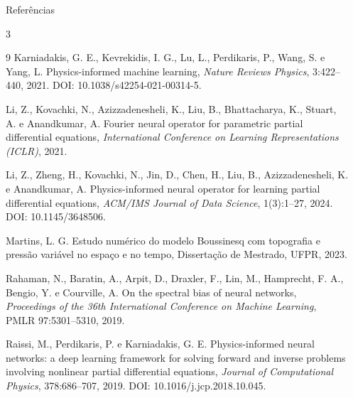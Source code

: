 \documentclass[final]{beamer}
\newlength{\sepwidth}
\newlength{\fullwidth}
\newcommand{\separatorcolumn}{\begin{column}{\sepwidth}\end{column}}
\begin{document}
\begin{frame}[t]
\begin{columns}[t]
\begin{column}{\fullwidth}

  \begin{block}{Referências}
    \scriptsize
    \begin{multicols}{3}
    \begin{thebibliography}{9}
      Karniadakis, G. E., Kevrekidis, I. G., Lu, L., Perdikaris, P., Wang, S. e Yang, L. Physics-informed machine learning, \textit{Nature Reviews Physics}, 3:422--440, 2021. DOI: 10.1038/s42254-021-00314-5.

      Li, Z., Kovachki, N., Azizzadenesheli, K., Liu, B., Bhattacharya, K., Stuart, A. e Anandkumar, A. Fourier neural operator for parametric partial differential equations, \textit{International Conference on Learning Representations (ICLR)}, 2021.

      Li, Z., Zheng, H., Kovachki, N., Jin, D., Chen, H., Liu, B., Azizzadenesheli, K. e Anandkumar, A. Physics-informed neural operator for learning partial differential equations, \textit{ACM/IMS Journal of Data Science}, 1(3):1--27, 2024. DOI: 10.1145/3648506.

      Martins, L. G. Estudo numérico do modelo Boussinesq com topografia e pressão variável no espaço e no tempo, Dissertação de Mestrado, UFPR, 2023.

      Rahaman, N., Baratin, A., Arpit, D., Draxler, F., Lin, M., Hamprecht, F. A., Bengio, Y. e Courville, A. On the spectral bias of neural networks, \textit{Proceedings of the 36th International Conference on Machine Learning}, PMLR 97:5301--5310, 2019.

      Raissi, M., Perdikaris, P. e Karniadakis, G. E. Physics-informed neural networks: a deep learning framework for solving forward and inverse problems involving nonlinear partial differential equations, \textit{Journal of Computational Physics}, 378:686--707, 2019. DOI: 10.1016/j.jcp.2018.10.045.
    \end{thebibliography}
    \end{multicols}
  \end{block}

\end{column}

\separatorcolumn
\end{columns}

\end{frame}
\end{document}
